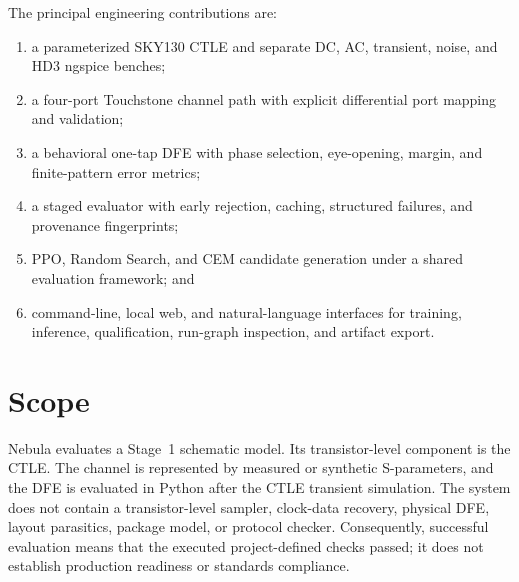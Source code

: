 The principal engineering contributions are:
\begin{enumerate}
  \item a parameterized SKY130 CTLE and separate DC, AC, transient, noise, and
        HD3 ngspice benches;
  \item a four-port Touchstone channel path with explicit differential port
        mapping and validation;
  \item a behavioral one-tap DFE with phase selection, eye-opening, margin, and
        finite-pattern error metrics;
  \item a staged evaluator with early rejection, caching, structured failures,
        and provenance fingerprints;
  \item PPO, Random Search, and CEM candidate generation under a shared
        evaluation framework; and
  \item command-line, local web, and natural-language interfaces for training,
        inference, qualification, run-graph inspection, and artifact export.
\end{enumerate}

\section{Scope}

Nebula evaluates a Stage~1 schematic model. Its transistor-level component is
the CTLE. The channel is represented by measured or synthetic S-parameters, and
the DFE is evaluated in Python after the CTLE transient simulation. The system
does not contain a transistor-level sampler, clock-data recovery, physical DFE,
layout parasitics, package model, or protocol checker. Consequently, successful
evaluation means that the executed project-defined checks passed; it does not
establish production readiness or standards compliance.
